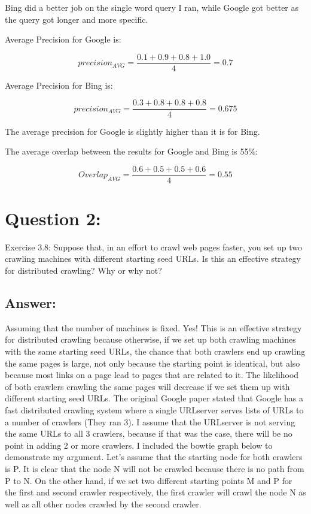 \documentclass[a4paper, 11pt]{article}
\begin{document}
Bing did a better job on the single word query I ran, while Google got better as the query got longer and more specific.

Average Precision for Google is:

$$ 
precision_{AVG} = \frac{0.1 + 0.9 + 0.8 + 1.0}{4} = 0.7
$$


Average Precision for Bing is:

$$ 
precision_{AVG} = \frac{0.3 + 0.8 + 0.8 + 0.8}{4} = 0.675
$$

The average precision for Google is slightly higher than it is for Bing.

The average overlap between the results for Google and Bing is 55\%:

$$ 
Overlap_{AVG} = \frac{0.6 + 0.5 + 0.5 + 0.6}{4} = 0.55
$$
 
\section*{Question 2:}
Exercise 3.8: Suppose that, in an effort to crawl web pages faster, you set up two crawling
machines with different starting seed URLs. Is this an effective strategy for
distributed crawling? Why or why not?

\subsection*{Answer:}
Assuming that the number of machines is fixed. Yes! This is an effective strategy for distributed crawling because otherwise, if we set up both crawling machines with the same starting seed URLs, the chance that both crawlers end up crawling the same pages is large, not only because the starting point is identical, but also because most links on a page lead to pages that are related to it. The likelihood of both crawlers crawling the same pages will decrease if we set them up with different starting seed URLs. The original Google paper stated that Google has a fast distributed crawling system where a single URLserver serves lists of URLs to a number of crawlers (They ran 3). I assume that the URLserver is not serving the same URLs to all 3 crawlers, because if that was the case, there will be no point in adding 2 or more crawlers. I included the bowtie graph below to demonstrate my argument. Let's assume that the starting node for both crawlers is P. It is clear that the node N will not be crawled because there is no path from P to N. On the other hand, if we set two different starting points M and P for the first and second crawler respectively, the first crawler will crawl the node N as well as all other nodes crawled by the second crawler.
\end{document}
